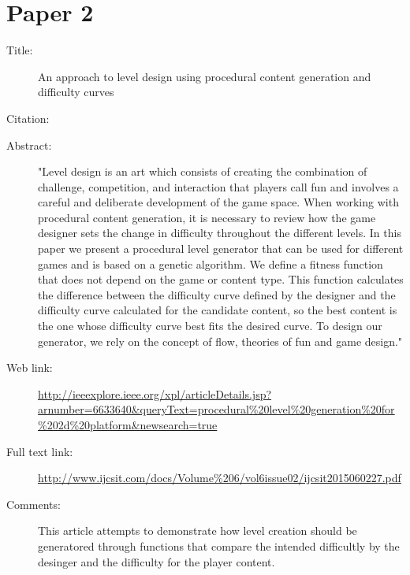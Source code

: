 \documentclass{scrartcl}
\begin{document}
\section*{Paper 2}
\begin{description}
\item[Title:] An approach to level design using procedural content generation and difficulty curves
\item[Citation:] \cite{diaz:2013}
\item[Abstract:] "Level design is an art which consists of creating the combination of challenge, competition, and interaction that players call fun and involves a careful and deliberate development of the game space. When working with procedural content generation, it is necessary to review how the game designer sets the change in difficulty throughout the different levels. In this paper we present a procedural level generator that can be used for different games and is based on a genetic algorithm. We define a fitness function that does not depend on the game or content type. This function calculates the difference between the difficulty curve defined by the designer and the difficulty curve calculated for the candidate content, so the best content is the one whose difficulty curve best fits the desired curve. To design our generator, we rely on the concept of flow, theories of fun and game design."
\item[Web link:] \url{http://ieeexplore.ieee.org/xpl/articleDetails.jsp?arnumber=6633640&queryText=procedural%20level%20generation%20for%202d%20platform&newsearch=true}
\item[Full text link:] \url{http://www.ijcsit.com/docs/Volume%206/vol6issue02/ijcsit2015060227.pdf}
\item[Comments:]  This article attempts to demonstrate how level creation should be generatored through functions that compare the intended difficultly by the desinger and the difficulty for the player content.
\end{description}
\end{document}
